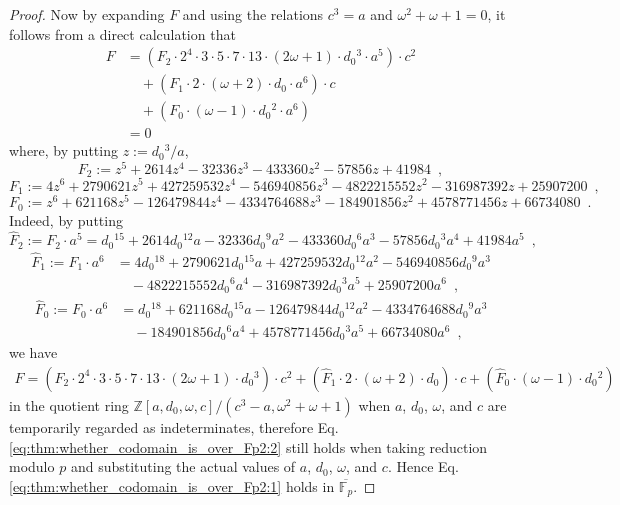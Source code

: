 \documentclass{article}
\theoremstyle{definition}
\newcommand{\FF}{\mathbb{F}}
\newcommand{\ZZ}{\mathbb{Z}}
\begin{document}
\begin{proof}
Now by expanding $F$ and using the relations $c^3 = a$ and $\omega^2 + \omega + 1 = 0$, it follows from a direct calculation that
\begin{equation}
\label{eq:thm:whether_codomain_is_over_Fp2:1}
\begin{split}
F
&= (F_2 \cdot 2^4 \cdot 3 \cdot 5 \cdot 7 \cdot 13 \cdot (2 \omega + 1) \cdot d_0{}^3 \cdot a^5) \cdot c^2 \\
&\quad + (F_1 \cdot 2 \cdot (\omega + 2) \cdot d_0 \cdot a^6) \cdot c \\
&\quad + (F_0 \cdot (\omega - 1) \cdot d_0{}^2 \cdot a^6) \\
&= 0
\end{split}
\end{equation}
where, by putting $z := d_0{}^3 / a$,
\[
F_2 := z^5 + 2614 z^4 - 32336 z^3 - 433360 z^2 - 57856 z + 41984 \enspace,
\]
\[
F_1 := 4 z^6 + 2790621 z^5 + 427259532 z^4 - 546940856 z^3 - 4822215552 z^2 - 316987392 z + 25907200 \enspace,
\]
\[
F_0 := z^6 + 621168 z^5 - 126479844 z^4 - 4334764688 z^3 - 184901856 z^2 + 4578771456 z + 66734080 \enspace.
\]
Indeed, by putting
\[
\widehat{F}_2
:= F_2 \cdot a^5
= d_0{}^{15} + 2614 d_0{}^{12} a - 32336 d_0{}^9 a^2 - 433360 d_0{}^6 a^3 - 57856 d_0{}^3 a^4 + 41984 a^5 \enspace,
\]
\[
\begin{split}
\widehat{F}_1
:= F_1 \cdot a^6
&= 4 d_0{}^{18} + 2790621 d_0{}^{15} a + 427259532 d_0{}^{12} a^2 - 546940856 d_0{}^9 a^3 \\
&\quad - 4822215552 d_0{}^6 a^4 - 316987392 d_0{}^3 a^5 + 25907200 a^6 \enspace,
\end{split}
\]
\[
\begin{split}
\widehat{F}_0
:= F_0 \cdot a^6
&= d_0{}^{18} + 621168 d_0{}^{15} a - 126479844 d_0{}^{12} a^2 - 4334764688 d_0{}^9 a^3 \\
&\quad - 184901856 d_0{}^6 a^4 + 4578771456 d_0{}^3 a^5 + 66734080 a^6 \enspace,
\end{split}
\]
we have
\begin{equation}
\label{eq:thm:whether_codomain_is_over_Fp2:2}
\begin{split}
F
= (\widehat{F}_2 \cdot 2^4 \cdot 3 \cdot 5 \cdot 7 \cdot 13 \cdot (2 \omega + 1) \cdot d_0{}^3) \cdot c^2 
+ (\widehat{F}_1 \cdot 2 \cdot (\omega + 2) \cdot d_0) \cdot c 
+ (\widehat{F}_0 \cdot (\omega - 1) \cdot d_0{}^2)
\end{split}
\end{equation}
in the quotient ring $\ZZ[a,d_0,\omega,c] / (c^3 - a, \omega^2 + \omega + 1)$ when $a$, $d_0$, $\omega$, and $c$ are temporarily regarded as indeterminates, therefore Eq.\eqref{eq:thm:whether_codomain_is_over_Fp2:2} still holds when taking reduction modulo $p$ and substituting the actual values of $a$, $d_0$, $\omega$, and $c$.
Hence Eq.\eqref{eq:thm:whether_codomain_is_over_Fp2:1} holds in $\overline{\FF_p}$.


\end{proof}
\end{document}
